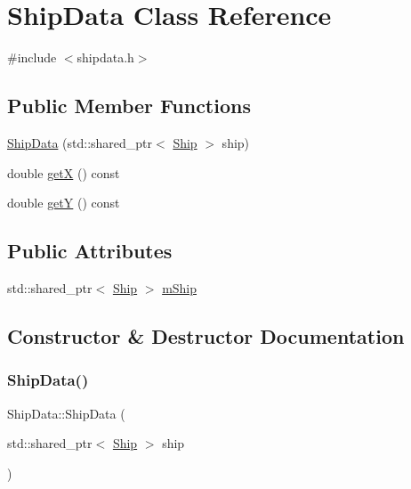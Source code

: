\hypertarget{class_ship_data}{}\section{Ship\+Data Class Reference}
\label{class_ship_data}


{\ttfamily \#include $<$shipdata.\+h$>$}

\subsection*{Public Member Functions}
\begin{DoxyCompactItemize}
\item 
\mbox{\hyperlink{class_ship_data_a7b6616dd313d634194428a1c1aedb1b9}{Ship\+Data}} (std\+::shared\+\_\+ptr$<$ \mbox{\hyperlink{class_ship}{Ship}} $>$ ship)
\item 
double \mbox{\hyperlink{class_ship_data_a309ae25057aa3c5297ba34a827a7f3d2}{getX}} () const
\item 
double \mbox{\hyperlink{class_ship_data_a9c4282e6c957373f48c247fcde166785}{getY}} () const
\end{DoxyCompactItemize}
\subsection*{Public Attributes}
\begin{DoxyCompactItemize}
\item 
std\+::shared\+\_\+ptr$<$ \mbox{\hyperlink{class_ship}{Ship}} $>$ \mbox{\hyperlink{class_ship_data_a4ab7b51aed7b54566f209dfac24a4100}{m\+Ship}}
\end{DoxyCompactItemize}


\subsection{Constructor \& Destructor Documentation}
\mbox{\label{class_ship_data_a7b6616dd313d634194428a1c1aedb1b9}} 
\subsubsection{\texorpdfstring{ShipData()}{ShipData()}}
{\footnotesize\ttfamily Ship\+Data\+::\+Ship\+Data (\begin{DoxyParamCaption}\item[{std\+::shared\+\_\+ptr$<$ \mbox{\hyperlink{class_ship}{Ship}} $>$}]{ship }\end{DoxyParamCaption})}




